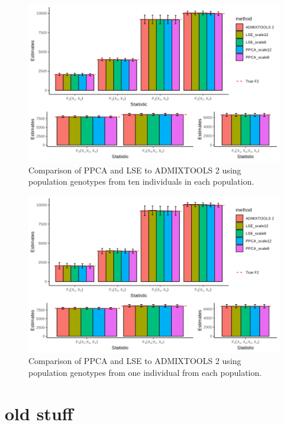 \documentclass[12pt, letterpaper]{article}
\begin{document}
\begin{figure}[ht!]
    \includegraphics[width=16.5cm]{plots/simfiles/Ne1000/split_times1000/npop10_nind100/plots_8_12/mu0.05_plot_all.png}
    \centering
    \caption{Comparison of PPCA and LSE to ADMIXTOOLS 2 using population genotypes from ten individuals in each population.}
    \label{figS2:pc_scale}
\end{figure}

\begin{figure}[ht!]
    \includegraphics[width=16.5cm]{plots/simfiles/Ne1000/split_times1000/npop10_nind100/plots_8_12/mu0.05_plot_all_1ind.png}
    \centering
    \caption{Comparison of PPCA and LSE to ADMIXTOOLS 2 using population genotypes from one individual from each population.}
    \label{figS2:pc_scale}
\end{figure}


\section{old stuff}
\end{document}
